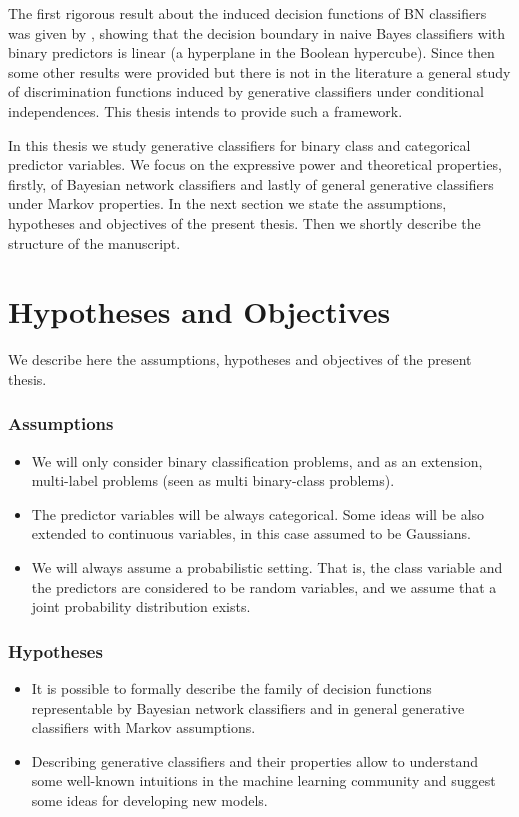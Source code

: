 \documentclass[11pt,a4paper, twoside]{book}
\begin{document}
The first rigorous result about the induced decision functions of BN classifiers was given by \citet{Minsky61stepstoward}, showing that the decision boundary in naive Bayes classifiers with binary predictors is linear (a hyperplane in the Boolean hypercube). Since then some other results were provided but there is not in the literature a general study of discrimination functions induced by generative classifiers under conditional independences. This thesis intends to provide such a framework.

In this thesis we study  generative classifiers for binary class and categorical predictor variables. We focus on the expressive power and theoretical properties, firstly, of Bayesian network classifiers and lastly of general generative classifiers under Markov properties.
In the next section we state the assumptions, hypotheses and objectives of the present thesis. Then we shortly describe the structure of the manuscript.

\section{Hypotheses and Objectives}

We describe here the assumptions, hypotheses and objectives of the present thesis.

\subsubsection{Assumptions}

\begin{itemize}
\item We will only consider binary classification problems, and as an extension, multi-label problems (seen as multi binary-class problems). 
\item The predictor variables will be always categorical. Some ideas will be also extended to continuous variables, in this case assumed to be Gaussians.
\item We will always assume a probabilistic setting. That is, the class variable and the predictors are considered to be random variables, and we assume that a joint probability distribution exists.
\end{itemize}

\subsubsection{Hypotheses}

\begin{itemize}
\item It is possible to formally describe the family of decision functions representable by Bayesian network classifiers and in general generative classifiers with Markov assumptions.
\item Describing generative classifiers and their properties allow to understand some well-known intuitions in the machine learning community and suggest some ideas for developing new models. 
\end{itemize}
\end{document}
